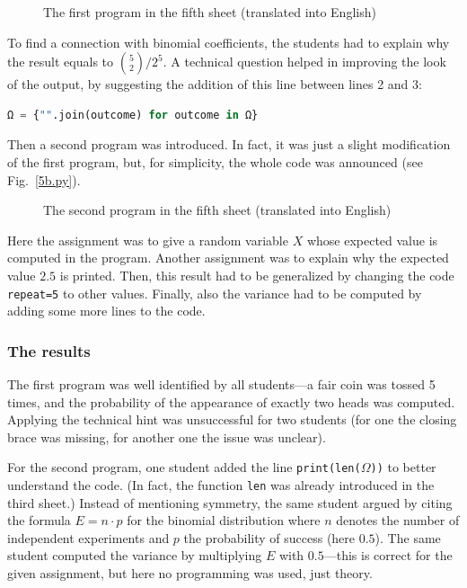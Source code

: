 \documentclass[]{interact}
\theoremstyle{plain}%
\theoremstyle{definition}
\theoremstyle{remark}
\begin{document}
\begin{figure}

\caption{The first program in the fifth sheet (translated into English)}
\label{5a.py}
\end{figure}

To find a connection with binomial coefficients, the students had to explain why the result
equals to $\binom{5}{2}/2^5$. A technical question helped in improving the look of the output,
by suggesting the addition of this line between lines 2 and 3:
\begin{lstlisting}[language=Python,numbers=none]
Ω = {"".join(outcome) for outcome in Ω}
\end{lstlisting}

Then a second program was introduced. In fact, it was just a slight modification of the first program,
but, for simplicity, the whole code was announced (see Fig.~\ref{5b.py}).
\begin{figure}

\caption{The second program in the fifth sheet (translated into English)}
\label{5a.py}
\end{figure}
Here the assignment was to give a random variable $X$ whose expected value is computed in the program.
Another assignment was to explain why the expected value $2.5$ is printed. Then, this result
had to be generalized by changing the code \texttt{repeat=5} to other values. Finally,
also the variance had to be computed by adding some more lines to the code.

\subsubsection*{The results}

The first program was well identified by all students---a fair coin was tossed 5 times,
and the probability of the appearance of exactly two heads was computed.
Applying the technical hint was unsuccessful for two students (for one the closing brace was missing,
for another one the issue was unclear).

For the second program, one student added the line \texttt{print(len($\Omega$))} to better understand the
code. (In fact, the function \texttt{len} was already introduced in the third sheet.) Instead
of mentioning symmetry, the same student argued by citing the formula $E=n\cdot p$ for the
binomial distribution where $n$ denotes the number of independent experiments and $p$ the probability
of success (here $0.5$). The same student computed the variance by multiplying $E$ with $0.5$---this
is correct for the given assignment, but here no programming was used, just theory.
\end{document}

